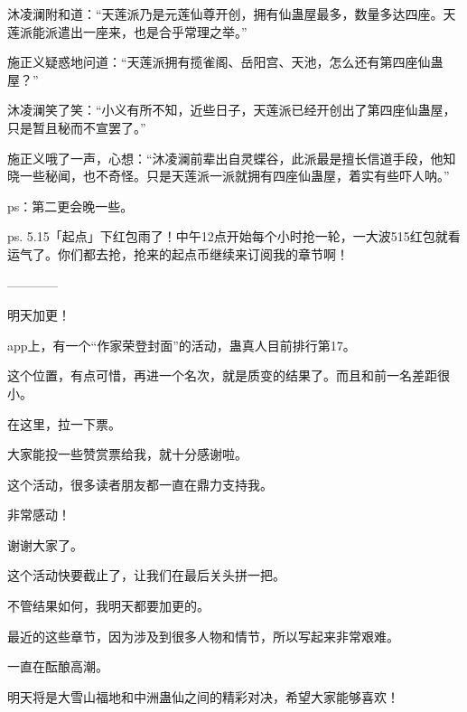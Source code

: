 \begin{this_body}
沐凌澜附和道：“天莲派乃是元莲仙尊开创，拥有仙蛊屋最多，数量多达四座。天莲派能派遣出一座来，也是合乎常理之举。”

施正义疑惑地问道：“天莲派拥有揽雀阁、岳阳宫、天池，怎么还有第四座仙蛊屋？”

沐凌澜笑了笑：“小义有所不知，近些日子，天莲派已经开创出了第四座仙蛊屋，只是暂且秘而不宣罢了。”

施正义哦了一声，心想：“沐凌澜前辈出自灵蝶谷，此派最是擅长信道手段，他知晓一些秘闻，也不奇怪。只是天莲派一派就拥有四座仙蛊屋，着实有些吓人呐。”

ps：第二更会晚一些。

ps. 5.15「起点」下红包雨了！中午12点开始每个小时抢一轮，一大波515红包就看运气了。你们都去抢，抢来的起点币继续来订阅我的章节啊！

------------

明天加更！

app上，有一个“作家荣登封面”的活动，蛊真人目前排行第17。

这个位置，有点可惜，再进一个名次，就是质变的结果了。而且和前一名差距很小。

在这里，拉一下票。

大家能投一些赞赏票给我，就十分感谢啦。

这个活动，很多读者朋友都一直在鼎力支持我。

非常感动！

谢谢大家了。

这个活动快要截止了，让我们在最后关头拼一把。

不管结果如何，我明天都要加更的。

最近的这些章节，因为涉及到很多人物和情节，所以写起来非常艰难。

一直在酝酿高潮。

明天将是大雪山福地和中洲蛊仙之间的精彩对决，希望大家能够喜欢！

\end{this_body}

